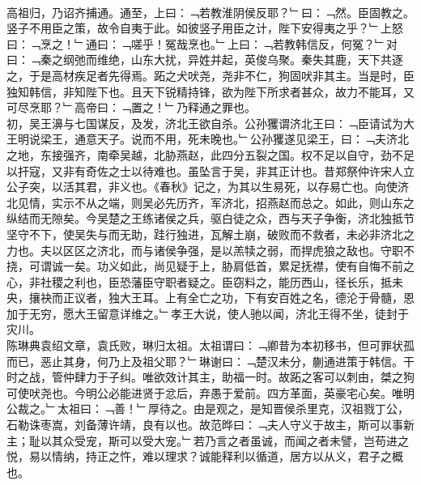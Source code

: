 \\
高祖归，乃诏齐捕通。通至，上曰：﹁若教淮阴侯反耶？﹂曰：﹁然。臣固教之。竖子不用臣之策，故令自夷于此。如彼竖子用臣之计，陛下安得夷之乎？﹂上怒曰：﹁烹之！﹂通曰：﹁嗟乎！冤哉烹也。﹂上曰：﹁若教韩信反，何冤？﹂对曰：﹁秦之纲弛而维绝，山东大扰，异姓并起，英俊乌聚。秦失其鹿，天下共逐之，于是高材疾足者先得焉。跖之犬吠尧，尧非不仁，狗固吠非其主。当是时，臣独知韩信，非知陛下也。且天下锐精持锋，欲为陛下所求者甚众，故力不能耳，又可尽烹耶？﹂高帝曰：﹁置之！﹂乃释通之罪也。
\\
初，吴王濞与七国谋反，及发，济北王欲自杀。公孙玃谓济北王曰：﹁臣请试为大王明说梁王，通意天子。说而不用，死未晚也。﹂公孙玃遂见梁王，曰：﹁夫济北之地，东接强齐，南牵吴越，北胁燕赵，此四分五裂之国。权不足以自守，劲不足以扞寇，又非有奇佐之士以待难也。虽坠言于吴，非其正计也。昔郑祭仲许宋人立公子突，以活其君，非义也。《春秋》记之，为其以生易死，以存易亡也。向使济北见情，实示不从之端，则吴必先历齐，军济北，招燕赵而总之。如此，则山东之纵结而无隙矣。今吴楚之王练诸侯之兵，驱白徒之众，西与天子争衡，济北独抵节坚守不下，使吴失与而无助，跬行独进，瓦解土崩，破败而不救者，未必非济北之力也。夫以区区之济北，而与诸侯争强，是以羔犊之弱，而捍虎狼之敌也。守职不挠，可谓诚一矣。功义如此，尚见疑于上，胁肩低首，累足抚襟，使有自悔不前之心，非社稷之利也，臣恐藩臣守职者疑之。臣窃料之，能历西山，径长乐，抵未央，攘袂而正议者，独大王耳。上有全亡之功，下有安百姓之名，德沦于骨髓，恩加于无穷，愿大王留意详维之。﹂孝王大说，使人驰以闻，济北王得不坐，徒封于灾川。\\
陈琳典袁绍文章，袁氏败，琳归太祖。太祖谓曰：﹁卿昔为本初移书，但可罪状孤而已，恶止其身，何乃上及祖父耶？﹂琳谢曰：﹁楚汉未分，蒯通进策于韩信。干时之战，管仲肆力于子纠。唯欲效计其主，助福一时。故跖之客可以刺由，桀之狗可使吠尧也。今明公必能进贤于忿后，弃愚于爱前。四方革面，英豪宅心矣。唯明公裁之。﹂太祖曰：﹁善！﹂厚待之。由是观之，是知晋侯杀里克，汉祖戮丁公，石勒诛枣嵩，刘备薄许靖，良有以也。故范晔曰：﹁夫人守义于故主，斯可以事新主；耻以其众受宠，斯可以受大宠。﹂若乃言之者虽诚，而闻之者未譬，岂苟进之悦，易以情纳，持正之忤，难以理求？诚能释利以循道，居方以从义，君子之概也。
%
%
